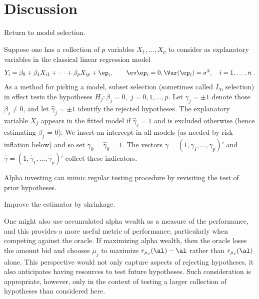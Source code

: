 \documentclass[12pt]{article}
\begin{document}
\section{ Discussion }


 Return to model selection.

  Suppose one has a collection of $p$ variables $X_1, \ldots, X_p$ to consider as
 explanatory variables in the classical linear regression model
 \begin{equation}
   Y_i = \beta_0 + \beta_1 X_{i1} + \cdots + \beta_p X_{ip} + \ep_i, 
     \qquad \ev \ep_i = 0, \Var(\ep_i)=\sigma^2,  \quad i = 1,\ldots,n\;.
 \label{eq:regr}
 \end{equation}
 As a method for picking a model, subset selection (sometimes called $L_0$
 selection) in effect tests the hypotheses $H_j: \beta_j = 0, \; j = 0, 1, \ldots, p$.
  Let $\gamma_j = \pm 1$ denote those $\beta_j \ne 0$, and let $\hat\gamma_j =
 \pm 1$ identify the rejected hypotheses.  The explanatory variable $X_j$
 appears in the fitted model if $\hat\gamma_j = 1$ and is excluded otherwise
 (hence estimating $\beta_j$ = 0).  We insert an intercept in all models (as
 needed by risk inflation below) and so set $\gamma_0=\hat\gamma_0 = 1$.  The
 vectors $\gamma = (1, \gamma_1, \ldots, \gamma_p)'$ and $\hat\gamma = (1,
 \hat\gamma_1, \ldots, \hat\gamma_p)'$ collect these indicators.


Alpha investing can mimic regular testing procedure by revisiting the test of
prior hypotheses. 

Improve the estimator by shrinkage.



 One might also use accumulated alpha wealth as a measure of the performance, and
 this provides a more useful metric of performance, particularly when competing
 against the oracle.  If maximizing alpha wealth, then the oracle loses the
 amount bid and chooses $\mu_j$ to maximize $r_{\mu_j}(\al)-\al$ rather than
 $r_{\mu_j}(\al)$ alone.  This perspective would not only capture aspects of
 rejecting hypotheses, it also anticipates having resources to test future
 hypotheses.  Such consideration is appropriate, however, only in the context of
 testing a larger collection of hypotheses than considered here.
\end{document}
